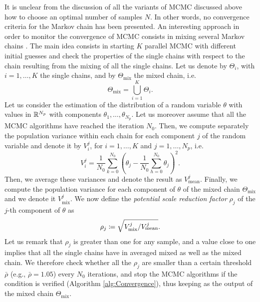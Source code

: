 It is unclear from the discussion of all the variants of MCMC discussed above how to choose an optimal number of samples $N$. In other words, no convergence criteria for the Markov chain has been presented. An interesting approach in order to monitor the convergence of MCMC consists in mixing several Markov chains \cite{GeS11}. The main idea consists in starting $K$ parallel MCMC with different initial guesses and check the properties of the single chains with respect to the chain resulting from the mixing of all the single chains. Let us denote by $\Theta_i$, with $i = 1, \ldots, K$ the single chains, and by $\Theta_{\mathrm{mix}}$ the mixed chain, i.e.
\begin{equation}
	\Theta_{\mathrm{mix}} = \bigcup_{i = 1}^{K} \Theta_i.
\end{equation}
Let us consider the estimation of the distribution of a random variable $\theta$ with values in $\mathbb{R}^{N_p}$ with components $\theta_1, \ldots, \theta_{N_p}$. Let us moreover assume that all the MCMC algorithms have reached the iteration $N_0$. Then, we compute separately the population variance within each chain for each component $j$ of the random variable and denote it by $V_i^j$, for $i = 1, \ldots, K$ and $j = 1, \ldots, N_p$, i.e.
\begin{equation}
	V_i^j = \frac{1}{N_0} \sum_{k=0}^{N_0} \left(\theta_j - \frac{1}{N_0}\sum_{h = 0}^{N_0} \theta_j \right)^2.
\end{equation}
Then, we average these variances and denote the result as $V^j_{\mathrm{mean}}$. Finally, we compute the population variance for each component of $\theta$ of the mixed chain $\Theta_{\mathrm{mix}}$ and we denote it $V^j_{\mathrm{mix}}$. We now define the \textit{potential scale reduction factor} $\rho_j$ of the $j$-th component of $\theta$ as \cite{GeS11}
\begin{equation}\label{eq:RhoMCMC}
	\rho_j \coloneqq \sqrt{ V^j_{\mathrm{mix}} / V_{\mathrm{mean}}^j }.
\end{equation}
Let us remark that $\rho_j$ is greater than one for any sample, and a value close to one implies that all the single chains have in averaged mixed as well as the mixed chain. We therefore check whether all the $\rho_j$ are smaller than a certain threshold $\bar \rho$ (e.g., $\bar \rho = 1.05$) every $N_0$ iterations, and stop the MCMC algorithms if the condition is verified (Algorithm \ref{alg:Convergence}), thus keeping as the output of the mixed chain $\Theta_{\mathrm{mix}}$.


